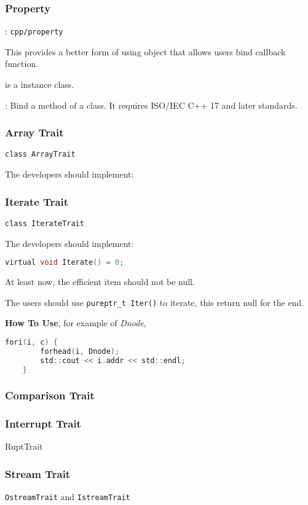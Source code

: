 
\subsubsection{Property}
: \verb`cpp/property`

This provides a better form of using object that allows users bind callback function.

 is a instance class.

: Bind a method of a class. It requires ISO/IEC C++ 17 and later standards.



\subsubsection{Array Trait}

\verb|class ArrayTrait|

The developers should implement:

\lstset{style=GlobalCxx}

\subsubsection{Iterate Trait}

\verb|class IterateTrait|

The developers should implement:

\lstset{style=GlobalC}
\begin{lstlisting}[language=C]
	virtual void Iterate() = 0;
\end{lstlisting}

At least now, the efficient item should not be null.

The users should use \verb|pureptr_t Iter()| to iterate, this return null for the end.

\textbf{How To Use}, for example of \textit{Dnode},

\lstset{style=GlobalC}
\begin{lstlisting}[language=C]
	fori(i, c) {
		forhead(i, Dnode);
		std::cout << i.addr << std::endl;
	}
\end{lstlisting}

\subsubsection{Comparison Trait}

\subsubsection{Interrupt Trait}

RuptTrait


\subsubsection{Stream Trait}

\verb`OstreamTrait` and \verb`IstreamTrait`

